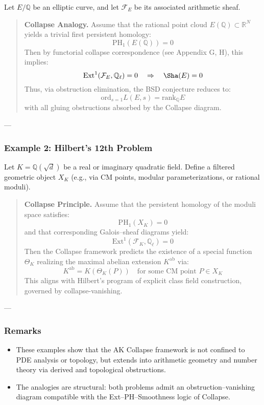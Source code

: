 \documentclass[11pt]{article}
\begin{document}
\begin{axiom}
\begin{axiom}
{{Let \( E/\mathbb{Q} \) be an elliptic curve, and let \( \mathcal{F}_E \) be its associated arithmetic sheaf.

\begin{quote}
\textbf{Collapse Analogy.}  
Assume that the rational point cloud \( E(\mathbb{Q}) \subset \mathbb{R}^N \)  
yields a trivial first persistent homology:
\[
\mathrm{PH}_1(E(\mathbb{Q})) = 0
\]
Then by functorial collapse correspondence (see Appendix G, H), this implies:
\[
\mathrm{Ext}^1(\mathcal{F}_E, \mathbb{Q}_\ell) = 0 \quad \Rightarrow \quad \Sha(E) = 0
\]
Thus, via obstruction elimination, the BSD conjecture reduces to:
\[
\mathrm{ord}_{s=1} L(E,s) = \mathrm{rank}_{\mathbb{Q}} E
\]
with all gluing obstructions absorbed by the Collapse diagram.
\end{quote}

---

\subsubsection*{Example 2: Hilbert’s 12th Problem}

Let \( K = \mathbb{Q}(\sqrt{d}) \) be a real or imaginary quadratic field.  
Define a filtered geometric object \( X_K \) (e.g., via CM points, modular parameterizations, or rational moduli).

\begin{quote}
\textbf{Collapse Principle.}  
Assume that the persistent homology of the moduli space satisfies:
\[
\mathrm{PH}_1(X_K) = 0
\]
and that corresponding Galois–sheaf diagrams yield:
\[
\mathrm{Ext}^1(\mathcal{F}_K, \mathbb{Q}_\ell) = 0
\]
Then the Collapse framework predicts the existence of a special function \( \Theta_K \)  
realizing the maximal abelian extension \( K^{\mathrm{ab}} \) via:
\[
K^{\mathrm{ab}} = K(\Theta_K(P)) \quad \text{for some CM point } P \in X_K
\]
This aligns with Hilbert’s program of explicit class field construction, governed by collapse-vanishing.
\end{quote}

---

\subsubsection*{Remarks}

\begin{itemize}
  \item These examples show that the AK Collapse framework is not confined to PDE analysis or topology,  
  but extends into arithmetic geometry and number theory via derived and topological obstructions.
  \item The analogies are structural: both problems admit an obstruction–vanishing diagram  
  compatible with the Ext–PH–Smoothness logic of Collapse.
\end{itemize}

}}
\end{axiom}
\end{axiom}
\end{document}
